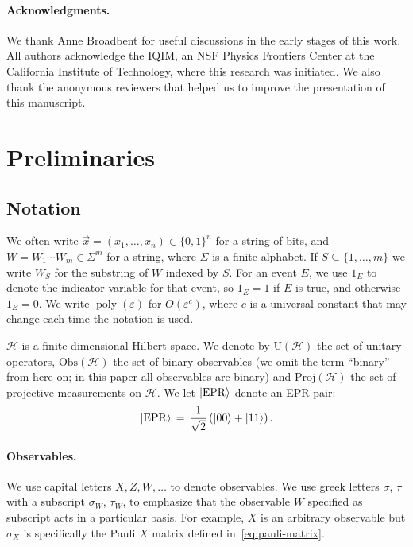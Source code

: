 \documentclass{toc}
\newcommand{\ket}[1]{|#1\rangle}
\newcommand{\setft}[1]{\mathrm{#1}}
\newcommand{\Proj}{\setft{Proj}}
\newcommand{\Obs}{\setft{Obs}}
\newcommand{\Unitary}{\setft{U}}
\DeclareMathOperator{\poly}{poly}
\newcommand{\mH}{\mathcal{H}}
\newcommand{\eps}{\varepsilon}
\newcommand{\EPR}{{\rm EPR}}
\begin{document}
\paragraph{Acknowledgments.} We thank Anne Broadbent for useful discussions in the early stages of this work. All authors acknowledge the IQIM, an NSF Physics Frontiers Center at the California Institute of Technology, where this research was initiated. We also thank the anonymous reviewers that helped us to improve the presentation of this manuscript.






\section{Preliminaries}\label{sec:prelim}


\subsection{Notation}
\label{sec:prelim-notation}

We often write $\vec{x} =(x_1,\ldots,x_n)\in \{0,1\}^n$ for a string of bits, and $W=W_1\cdots W_m\in\Sigma^m$ for a string, where $\Sigma$ is a finite alphabet. If $S\subseteq \{1,\ldots,m\}$ we write $W_S$ for the substring of $W$ indexed by $S$. For an event $E$, we use $1_{E}$ to denote the indicator variable for that event, so $1_E=1$ if $E$ is true, and otherwise $1_E=0$. We write $\poly(\eps)$ for $O(\eps^c)$, where $c$ is a universal constant that may change each time the notation is used. 

$\mH$ is a finite-dimensional Hilbert space.  We denote by $\Unitary(\mH)$ the set of unitary operators, $\Obs(\mH)$ the set of binary observables (we omit the term ``binary'' from here on; in this paper all observables are binary) and $\Proj(\mH)$ the set of projective measurements on $\mH$.
%
%
We let $\ket{\EPR}$ denote an EPR pair: 
$$\ket{\EPR}\,=\,\frac{1}{\sqrt{2}}\left(\ket{00}+\ket{11}\right).$$


\paragraph{Observables.}
We use capital letters $X,Z,W,\ldots$ to denote observables. We use greek letters $\sigma$, $\tau$ with a subscript $\sigma_W$, $\tau_W$, to emphasize that the observable $W$ specified as subscript acts in a particular basis. For example, $X$ is an arbitrary observable but $\sigma_X$ is specifically the Pauli $X$ matrix defined in~\eqref{eq:pauli-matrix}.
\end{document}
